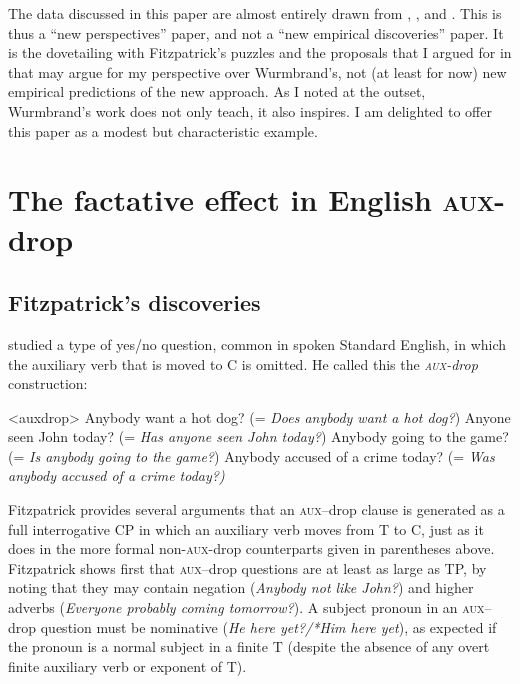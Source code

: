 \documentclass[output=paper]{langscibook}
\begin{document}
The data discussed in this paper are almost entirely drawn from \citet{fitzpatrick2006deletion}, \citet{Pesetsky:2019aa}, and \citet{Wurmbrand:2014aa}. This is thus a “new perspectives” paper, and not a “new empirical discoveries” paper. It is the dovetailing with Fitzpatrick's puzzles and the proposals that I argued for in \citet{Pesetsky:2019aa} that may argue for my perspective over Wurmbrand's, not (at least for now) new empirical predictions of the new approach. As I noted at the outset, Wurmbrand's work does not only teach, it also inspires. I am delighted to offer this paper as a modest but characteristic example.

\section{The factative effect in English  \textsc{aux-}drop }

\subsection{Fitzpatrick's discoveries}

\citet{fitzpatrick2006deletion} studied a type of yes/no question, common in spoken Standard English, in which the auxiliary verb that is moved to C is omitted. He called this the \textit{\textsc{aux}-drop} construction: 

\pex<auxdrop>
\a Anybody want a hot dog? (= \emph{Does anybody want a hot dog?}) 
\a Anyone seen John today? (= \emph{Has anyone seen John today?})
\a Anybody going to the game? (= \emph{Is anybody going to the game?})
\a Anybody accused of a crime today? (= \emph{Was anybody accused of a crime today?)}
\xe

\noindent Fitzpatrick provides several arguments that an \textsc{aux}--drop clause is generated as a full interrogative CP in which an auxiliary verb moves from T to C, just as it does in the more formal non-\textsc{aux-}drop counterparts given in parentheses above. Fitzpatrick shows first that \textsc{aux}--drop questions are at least as large as TP, by noting that they may contain negation (\textit{Anybody not like John?}) and higher adverbs (\textit{Everyone probably coming tomorrow?}). A subject pronoun in an \textsc{aux}--drop question must be nominative (\textit{He here yet?/{*}Him here yet}), as expected if the pronoun is a normal subject in a finite T (despite the absence of any overt finite auxiliary verb or exponent of T). 
\end{document}
